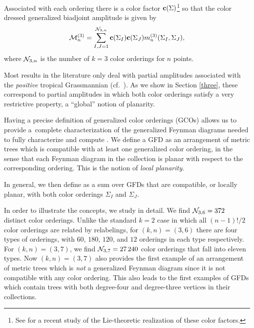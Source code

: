 \documentclass[pdftex]{sigma}
\theoremstyle{definition}
\numberwithin{equation}{section}
\begin{document}
Associated with each ordering there is a color factor
${\bf c}(\Sigma)$\footnote{See \cite{Early:2023dlt} for a recent study of the Lie-theoretic
realization of these color factors.} so that the color dressed generalized biadjoint amplitude is given by
\begin{equation*}%
 {\mathcal M}^{(3)}_n = \sum_{I,J=1}^{{\cal N}_{3,n}} {\bf c}(\Sigma_I){\bf c}(\Sigma_J) m_n^{(3)}(\Sigma_I,\Sigma_J),
\end{equation*}
%
where ${\cal N}_{3,n}$ is the number of $k=3$ color orderings for $n$ points.

Most results in the literature only deal with partial amplitudes associated with the \textit{positive} tropical Grassmannian (cf.\ \cite{Arkani-Hamed:2019rds,Arkani-Hamed:2020cig,MR4449810,Early:2019eun,Henke:2021ity,
Lukowski:2020dpn,speyer2005tropical,speyer2021positive}). As we show in Section \ref{three}, these correspond to partial amplitudes in which both color orderings satisfy a very restrictive property, a ``global'' notion of planarity.

Having a precise definition of generalized color orderings (GCOs) allows us to provide a~complete characterization of the generalized Feynman diagrams needed to fully characterize and compute . We define a GFD as an arrangement of metric trees which is compatible with at least one generalized color ordering, in the sense that each Feynman diagram in the collection is planar with respect to the corresponding ordering. This is the notion of {\it local planarity}.

In general, we then define  as a sum over GFDs that are compatible, or locally planar, with both color orderings $\Sigma_I$ and $\Sigma_J$.

In order to illustrate the concepts, we study  in detail. We find ${\cal N}_{3,6}=372$ distinct color orderings. Unlike the standard $k=2$ case in which all $(n-1)!/2$ color orderings are related by relabelings, for $(k,n)=(3,6)$ there are four types of orderings, with $60$, $180$, $120$, and $12$ orderings in each type respectively. For $(k,n)=(3,7)$, we find ${\cal N}_{3,7}=27\, 240$ color orderings that fall into eleven types. Now $(k,n)=(3,7)$ also provides the first example of an arrangement of metric trees which is {\it not} a generalized Feynman diagram since it is not compatible with any color ordering. This also leads to the first examples of GFDs which contain trees with both degree-four and degree-three vertices in their collections.
\end{document}
